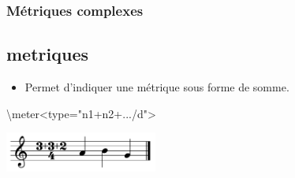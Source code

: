 \documentclass[12pt]{beamer}
\newenvironment{code}
  {\fontfamily{prc}\selectfont}{}
\begin{document}
    \begin{frame}
    \frametitle{Métriques complexes}
    \subsection{metriques}
    
    \begin{itemize}
    \item Permet d’indiquer une métrique sous forme de somme.
    \end{itemize}
    
    \begin{center}
    \begin{code} \textbackslash{}meter\textless{}type="n1+n2+.../d"\textgreater{} \end{code}
    
    \vspace{5mm}
    
    \includegraphics[width=5cm]{img/partitions/complexMeter.pdf}
    \end{center}
    
    \end{frame}
    
\end{document}
